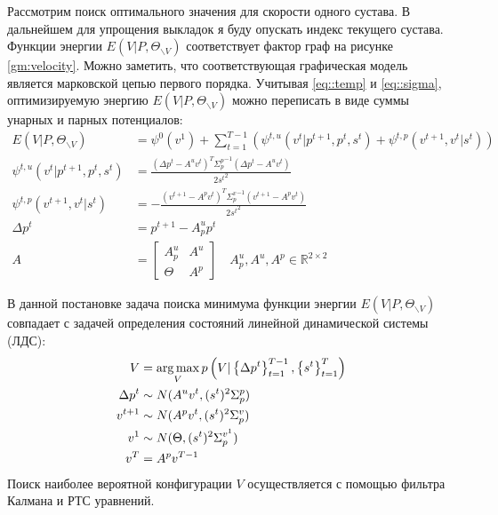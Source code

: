 Рассмотрим поиск оптимального значения для скорости одного сустава. В дальнейшем для упрощения выкладок я буду опускать индекс текущего сустава. Функции энергии $E(V|P, \Theta_{\backslash V})$ соответствует фактор граф на рисунке \ref{gm:velocity}. Можно заметить, что соответствующая графическая модель является марковской цепью первого порядка. Учитывая \eqref{eq::temp} и \eqref{eq::sigma}, оптимизируемую энергию $E(V|P, \Theta_{\backslash V})$ можно переписать в виде суммы унарных и парных потенциалов:
\begin{equation}
	\begin{aligned}
		E(V|P, \Theta_{\backslash V}) &= \psi^0(v^1) + \sum_{t=1}^{T-1} \left( \psi^{t,u}(v^t|p^{t+1}, p^{t}, s^t) + \psi^{t,p}(v^{t+1}, v^{t}|s^t) \right) \\		
		\psi^{t,u}(v^t|p^{t+1}, p^{t}, s^t) &= \frac{(\Delta p^t - A^u v^t)^T {\Sigma_p^p}^{-1} (\Delta p^t - A^u v^t)} {2 {s^t}^2} \\
		\psi^{t,p}(v^{t+1}, v^{t}|s^t) &= -\frac{(v^{t+1} - A^p v^t)^T {\Sigma_p^v}^{-1} (v^{t+1} - A^p v^t)} {2 {s^t}^2} \\ 
		\Delta p^t &= p^{t+1} - A_p^u p^t \\
		A &= \left[
		\begin{array}{c|c}
		A_p^u  & A^u \\ \hline
		\Theta & A^p
		\end{array}
		\right] \quad
		A_p^u, A^u, A^p \in \mathbb{R}^{2 \times 2}
	\end{aligned}
\end{equation}

В данной постановке задача поиска минимума функции энергии $E(V|P, \Theta_{\backslash V})$ совпадает с задачей определения состояний линейной динамической системы (ЛДС):
\begin{equation}
\begin{aligned}
	V &= \operatorname*{arg\,max}_V {p\left(V | \left\{\Delta p^t\right\}_{t=1}^{T-1}, \left\{s^t\right\}_{t=1}^T\right)} \\ 
	\Delta p^t &\sim N(A^u v^t, (s^t)^2\Sigma_p^p) \\
	v^{t+1} &\sim N(A^p v^t, (s^t)^2\Sigma_p^v) \\
	v^1 &\sim N(\Theta, (s^t)^2\Sigma_p^{v^1}) \\
	v^T &= A^p v^{T-1}
\end{aligned}
\end{equation}
Поиск наиболее вероятной конфигурации $V$ осуществляется с помощью фильтра Калмана и РТС уравнений.

